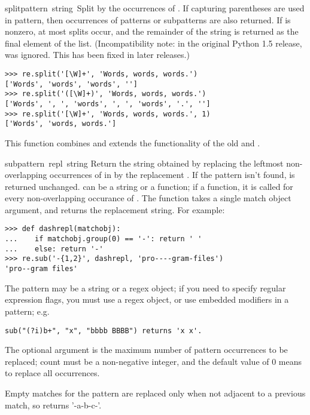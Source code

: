 \begin{funcdesc}{split}{pattern\, string\, }
  Split  by the occurrences of .  If
  capturing parentheses are used in pattern, then occurrences of
  patterns or subpatterns are also returned.
  If  is nonzero, at most  splits
  occur, and the remainder of the string is returned as the final
  element of the list.  (Incompatibility note: in the original Python
  1.5 release,  was ignored.  This has been fixed in
  later releases.)
%
\bcode\begin{verbatim}
>>> re.split('[\W]+', 'Words, words, words.')
['Words', 'words', 'words', '']
>>> re.split('([\W]+)', 'Words, words, words.')
['Words', ', ', 'words', ', ', 'words', '.', '']
>>> re.split('[\W]+', 'Words, words, words.', 1)
['Words', 'words, words.']
\end{verbatim}\ecode
%
  This function combines and extends the functionality of
  the old  and .
\end{funcdesc}

\begin{funcdesc}{sub}{pattern\, repl\, string}
Return the string obtained by replacing the leftmost non-overlapping
occurrences of  in  by the replacement
.  If the pattern isn't found,  is returned
unchanged.   can be a string or a function; if a function,
it is called for every non-overlapping occurance of .
The function takes a single match object argument, and returns the
replacement string.  For example:
%
\bcode\begin{verbatim}
>>> def dashrepl(matchobj):
...    if matchobj.group(0) == '-': return ' '
...    else: return '-'
>>> re.sub('-{1,2}', dashrepl, 'pro----gram-files')
'pro--gram files'
\end{verbatim}\ecode
%
The pattern may be a string or a 
regex object; if you need to specify
regular expression flags, you must use a regex object, or use
embedded modifiers in a pattern; e.g.

\begin{verbatim}
sub("(?i)b+", "x", "bbbb BBBB") returns 'x x'.
\end{verbatim}

The optional argument  is the maximum number of pattern
occurrences to be replaced; count must be a non-negative integer, and
the default value of 0 means to replace all occurrences.

Empty matches for the pattern are replaced only when not adjacent to a
previous match, so  returns '-a-b-c-'.
\end{funcdesc}


